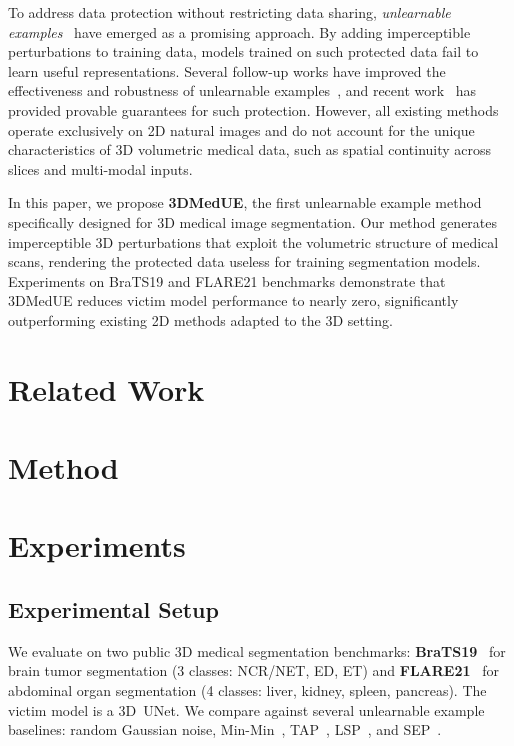 \documentclass[runningheads]{llncs}
\begin{document}
To address data protection without restricting data sharing, \emph{unlearnable
examples}~\cite{huang2021unlearnable} have emerged as a promising approach.
By adding imperceptible perturbations to training data, models trained on
such protected data fail to learn useful representations. Several follow-up
works have improved the effectiveness and robustness of unlearnable
examples~\cite{fowl2021adversarial,yu2022availability,liu2023stable}, and
recent work~\cite{wang2025provably} has provided provable guarantees for
such protection. However, all existing methods operate exclusively on 2D
natural images and do not account for the unique characteristics of 3D
volumetric medical data, such as spatial continuity across slices and
multi-modal inputs.

In this paper, we propose \textbf{3DMedUE}, the first unlearnable example
method specifically designed for 3D medical image segmentation. Our method
generates imperceptible 3D perturbations that exploit the volumetric structure
of medical scans, rendering the protected data useless for training
segmentation models. Experiments on BraTS19 and FLARE21 benchmarks demonstrate
that 3DMedUE reduces victim model performance to nearly zero, significantly
outperforming existing 2D methods adapted to the 3D setting.

\section{Related Work}\label{sec:related}


\section{Method}\label{sec:method}


\section{Experiments}\label{sec:exp}

\subsection{Experimental Setup}\label{sec:setup}

We evaluate on two public 3D medical segmentation benchmarks:
\textbf{BraTS19}~\cite{menze2014multimodal} for brain tumor segmentation
(3 classes: NCR/NET, ED, ET) and \textbf{FLARE21}~\cite{ma2022fast} for
abdominal organ segmentation (4 classes: liver, kidney, spleen, pancreas).
The victim model is a 3D~UNet. We compare against several unlearnable example
baselines: random Gaussian noise, Min-Min~\cite{huang2021unlearnable},
TAP~\cite{fowl2021adversarial}, LSP~\cite{yu2022availability}, and
SEP~\cite{liu2023stable}.
\end{document}

